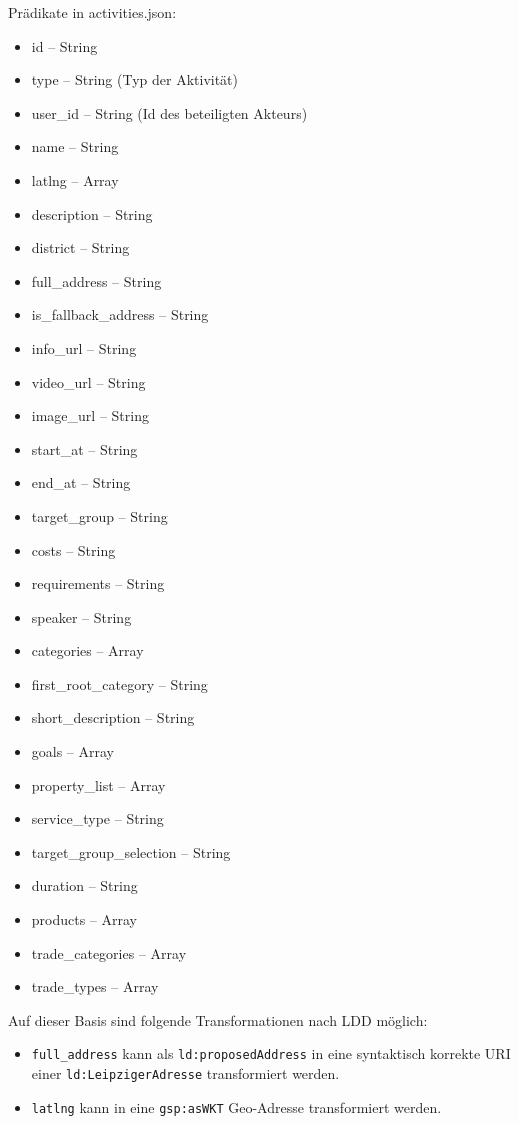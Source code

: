 \documentclass[a4paper,11pt]{article}
\begin{document}
Prädikate in activities.json:
\begin{itemize}\itemsep0pt
  \item id -- String
  \item type -- String (Typ der Aktivität)
  \item user\_id -- String (Id des beteiligten Akteurs)
  \item name -- String
  \item latlng -- Array
  \item description -- String
  \item district -- String
  \item full\_address -- String
  \item is\_fallback\_address -- String
  \item info\_url -- String
  \item video\_url -- String
  \item image\_url -- String
  \item start\_at -- String
  \item end\_at -- String
  \item target\_group -- String
  \item costs -- String
  \item requirements -- String
  \item speaker -- String
  \item categories -- Array
  \item first\_root\_category -- String
  \item short\_description -- String
  \item goals -- Array
  \item property\_list -- Array
  \item service\_type -- String
  \item target\_group\_selection -- String
  \item duration -- String
  \item products -- Array
  \item trade\_categories -- Array
  \item trade\_types -- Array
\end{itemize}

Auf dieser Basis sind folgende Transformationen nach LDD möglich:
\begin{itemize}\raggedright
\item \texttt{full\_address} kann als \texttt{ld:proposedAddress} in eine
  syntaktisch korrekte URI einer \texttt{ld:LeipzigerAdresse} transformiert
  werden. 
\item \texttt{latlng} kann in eine \texttt{gsp:asWKT} Geo-Adresse
  transformiert werden.
\end{itemize}
\end{document}
